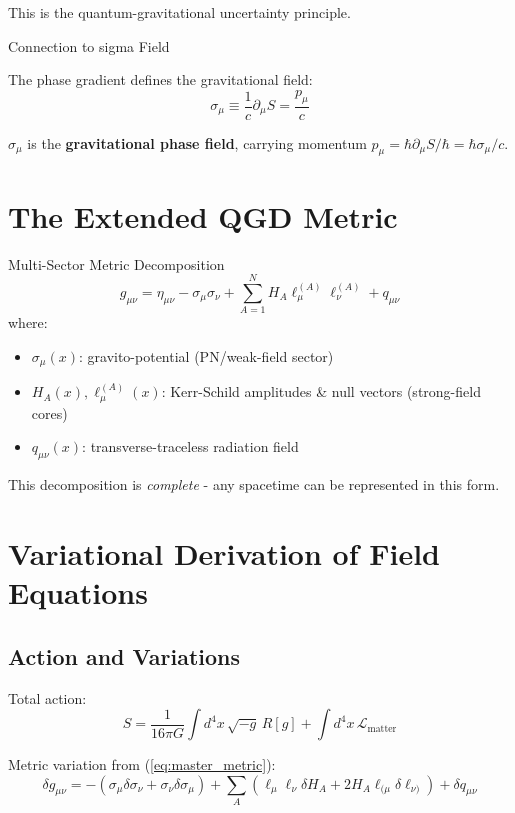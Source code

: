 \documentclass[11pt,a4paper]{article}
\theoremstyle{definition}
\theoremstyle{remark}
\begin{document}
		This is the quantum-gravitational uncertainty principle.
		
		Connection to sigma Field
		
		The phase gradient defines the gravitational field:
		\begin{equation}
			\boxed{\sigma_\mu \equiv \frac{1}{c}\partial_\mu S = \frac{p_\mu}{c}}
		\end{equation}
		
		$\sigma_\mu$ is the \textbf{gravitational phase field}, carrying momentum $p_\mu = \hbar\partial_\mu S/\hbar = \hbar\sigma_\mu/c$.
		
		\section{The Extended QGD Metric}
		
		Multi-Sector Metric Decomposition
			\begin{equation}\label{eq:master_metric}
				\boxed{g_{\mu\nu} = \eta_{\mu\nu} - \sigma_\mu\sigma_\nu + \sum_{A=1}^N H_A\ell_\mu^{(A)}\ell_\nu^{(A)} + q_{\mu\nu}}
			\end{equation}
			where:
			\begin{itemize}
				\item $\sigma_\mu(x)$: gravito-potential (PN/weak-field sector)
				\item $H_A(x), \ell_\mu^{(A)}(x)$: Kerr-Schild amplitudes \& null vectors (strong-field cores)
				\item $q_{\mu\nu}(x)$: transverse-traceless radiation field
			\end{itemize}
		
		This decomposition is \emph{complete} - any spacetime can be represented in this form.
		
		\section{Variational Derivation of Field Equations}
		
		\subsection{Action and Variations}
		
		Total action:
		\begin{equation}
			S = \frac{1}{16\pi G}\int d^4x\, \sqrt{-g}\, R[g] + \int d^4x\, \mathcal{L}_{\text{matter}}
		\end{equation}
		
		Metric variation from (\ref{eq:master_metric}):
		\begin{equation}
			\delta g_{\mu\nu} = -(\sigma_\mu\delta\sigma_\nu + \sigma_\nu\delta\sigma_\mu) + \sum_A\left(\ell_\mu\ell_\nu\delta H_A + 2H_A\ell_{(\mu}\delta\ell_{\nu)}\right) + \delta q_{\mu\nu}
		\end{equation}
		
\end{document}
